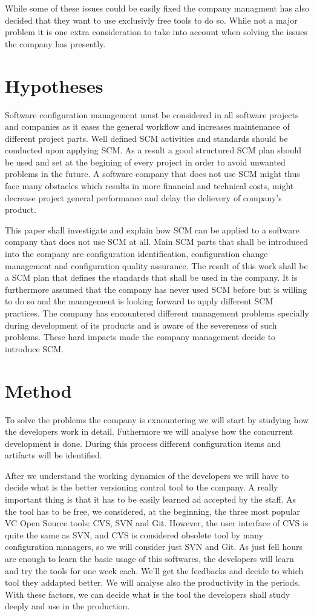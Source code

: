 \documentclass[a4paper]{article}
\begin{document}
While some of these issues could be easily fixed the company managment has also decided that they want to use exclusivly free tools to do so. While not a major problem it is one extra consideration to take into account when solving the issues the company has presently.

\section{Hypotheses}
Software configuration management must be considered in all software projects and companies as it eases the general workflow and increases maintenance of different project parts. Well defined SCM activities and standards should be conducted upon applying SCM. As a result a good structured SCM plan should be used and set at the begining of every project in order to avoid unwanted problems in the future. A software company that does not use SCM might thus face many obstacles which results in more financial and technical costs, might decrease project general performance and delay the delievery of company's product. 

This paper shall investigate and explain how SCM can be applied to a software company that does not use SCM at all. Main SCM parts that shall be introduced into the company are configuration identification, configuration change management and configuration quality assurance. The result of this work shall be a SCM plan that defines the standards that shall be used in the company. It is furthermore assumed that the company has never used SCM before but is willing to do so and the management is looking forward to apply different SCM practices. The company has encountered different management problems specially during development of its products and is aware of the severeness of such problems. These hard impacts made the company management decide to introduce SCM.

\section{Method}
To solve the problems the company is exnountering we will start by studying how the developers work in detail. Futhermore we will analyse how the concurrent development is done. During this process different configuration items and artifacts will be identified.

After we understand the working dynamics of the developers we will have to decide what is the better versioning control tool to the company. A really important thing is that it has to be easily learned ad accepted by the staff. As the tool has to be free, we considered, at the beginning, the three most popular VC Open Source tools: CVS, SVN and Git. However, the user interface of CVS is quite the same as SVN, and CVS is considered obsolete tool by many configuration managers, so we will consider just SVN and Git. As just fell hours are enough to learn the basic usage of this softwares, the developers will learn and try the tools for one week each. We'll get the feedbacks and decide to which tool they addapted better. We will analyse also the productivity in the periods. With these factors, we can decide what is the tool the developers shall study deeply and use in the production.
\end{document}
